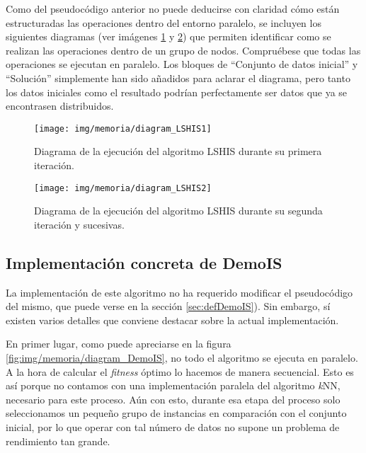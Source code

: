Como del pseudocódigo anterior no puede deducirse con claridad cómo están estructuradas las operaciones dentro del entorno paralelo, se incluyen los siguientes diagramas (ver imágenes \ref{fig:img/memoria/diagram_LSHIS1} y \ref{fig:img/memoria/diagram_LSHIS2}) que permiten identificar como se realizan las operaciones dentro de un grupo de nodos. Compruébese que todas las operaciones se ejecutan en paralelo. Los bloques de ``Conjunto de datos inicial'' y ``Solución'' simplemente han sido añadidos para aclarar el diagrama, pero tanto los datos iniciales como el resultado podrían perfectamente ser datos que ya se encontrasen distribuidos.

	\begin{figure}[!h]
		\centering
		\texttt{[image: img/memoria/diagram\_LSHIS1]}
		\caption{Diagrama de la ejecución del algoritmo LSHIS durante su primera iteración.}\label{fig:img/memoria/diagram_LSHIS1}
	\end{figure}
	\FloatBarrier
	
		\begin{figure}[!h]
		\centering
		\texttt{[image: img/memoria/diagram\_LSHIS2]}
		\caption{Diagrama de la ejecución del algoritmo LSHIS durante su segunda iteración y sucesivas.}\label{fig:img/memoria/diagram_LSHIS2}
	\end{figure}
	\FloatBarrier



\subsection{Implementación concreta de DemoIS}

La implementación de este algoritmo no ha requerido modificar el pseudocódigo del mismo, que puede verse en la sección \ref{sec:defDemoIS}). Sin embargo, sí existen varios detalles que conviene destacar sobre la actual implementación.

En primer lugar, como puede apreciarse en la figura \ref{fig:img/memoria/diagram_DemoIS}, no todo el algoritmo se ejecuta en paralelo. A la hora de calcular el \textit{fitness} óptimo lo hacemos de manera secuencial. Esto es así porque no contamos con una implementación paralela del algoritmo \textit{k}NN, necesario para este proceso. Aún con esto, durante esa etapa del proceso solo seleccionamos un pequeño grupo de instancias en comparación con el conjunto inicial, por lo que operar con tal número de datos no supone un problema de rendimiento tan grande.

